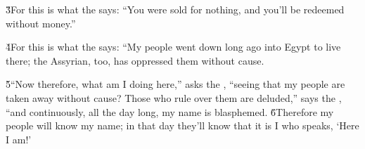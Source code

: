 \v{3}For this is what the  says: ``You were sold for nothing, and you'll be redeemed without money.''

\v{4}For this is what the  says: ``My people went down long ago into Egypt to live there; the Assyrian, too, has oppressed them without cause.

\v{5}``Now therefore, what am I doing here,'' asks the , ``seeing that my people are taken away without cause? Those who rule over them are deluded,'' says the , ``and continuously, all the day long, my name is blasphemed. \v{6}Therefore my people will know my name; in that day they'll know that it is I who speaks, `Here I am!'

